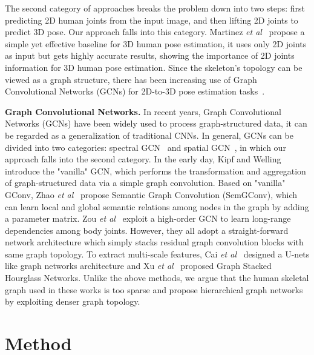 \documentclass{bmvc2k}
\def\etal{\emph{et al}\bmvaOneDot}
\begin{document}
The  second category of approaches breaks the problem down into two steps: first predicting 2D human joints from the input image, and then lifting 2D joints  to predict 3D pose. Our approach falls into this category. Martinez \etal~\cite{2017simple} propose a simple yet effective baseline for 3D human pose estimation, it uses only 2D joints as input but gets highly accurate results, showing the importance of 2D joints information for 3D human pose estimation. Since the  skeleton’s topology can be viewed as a graph structure, there has been increasing use of Graph Convolutional Networks (GCNs) for 2D-to-3D  pose estimation tasks~\cite{zhao2019semantic,liu2020comprehensive,2019Exploiting,2021Graph,kong2020sia,zeng2021learning}.

\textbf{Graph Convolutional Networks.} In recent years,
Graph Convolutional Networks (GCNs) have been widely used to process graph-structured data, it can be regarded as a generalization of traditional CNNs. In general, GCNs can be divided into two categories: spectral GCN~\cite{defferrard2016convolutional,bruna2013spectral} and spatial GCN~\cite{niepert2016learning,kipf2016semi,ve2018graph,graphsage}, in which our approach falls into the second category. In the early day, Kipf and Welling~\cite{kipf2016semi} introduce the "vanilla" GCN,  which performs the transformation and aggregation of graph-structured data via a simple graph convolution. Based on "vanilla" GConv, Zhao \etal~\cite{zhao2019semantic}  propose Semantic Graph Convolution (SemGConv), which can learn local and global semantic relations among nodes
in the graph by adding a parameter matrix. Zou \etal~\cite{zou2020high} exploit a high-order GCN to learn long-range dependencies among body joints. However, they all adopt a straight-forward network architecture which simply stacks residual graph convolution blocks with same graph topology. To extract multi-scale features, Cai \etal~\cite{2019Exploiting} designed a U-nets like graph networks architecture and Xu \etal~\cite{2021Graph} proposed Graph Stacked Hourglass Networks. Unlike the above methods, we argue that the human skeletal graph used in these works is too sparse and propose hierarchical graph networks by exploiting denser graph topology.









\section{Method}
\end{document}

